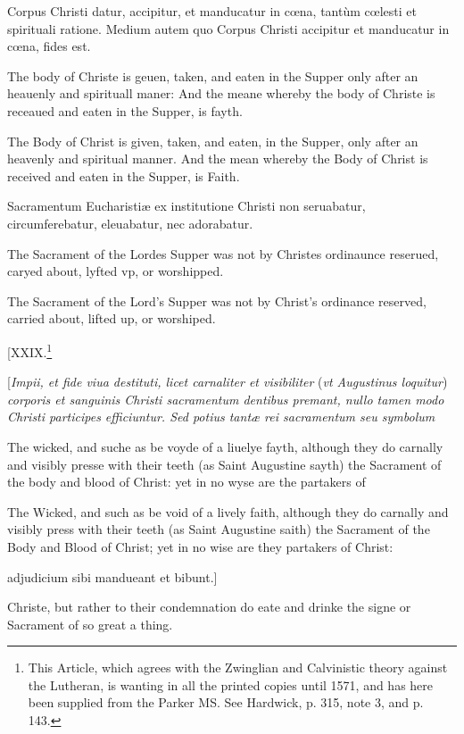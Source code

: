 Corpus Christi datur, accipitur, et manducatur in cœna, tantùm cœlesti et spirituali ratione. Medium autem quo Corpus Christi accipitur et manducatur in cœna, fides est.

The body of Christe is geuen, taken, and eaten in the Supper only after an heauenly and spirituall maner: And the meane whereby the body of Christe is receaued and eaten in the Supper, is fayth.

The Body of Christ is given, taken, and eaten, in the Supper, only after an heavenly and spiritual manner. And the mean whereby the Body of Christ is received and eaten in the Supper, is Faith.

Sacramentum Eucharistiæ ex institutione Christi non seruabatur, circumferebatur, eleuabatur, nec adorabatur.

The Sacrament of the Lordes Supper was not by Christes ordinaunce reserued, caryed about, lyfted vp, or worshipped.

The Sacrament of the Lord's Supper was not by Christ's ordinance reserved, carried about, lifted up, or worshiped.

[XXIX.\footnote{This Article, which agrees with the Zwinglian and Calvinistic theory against the Lutheran, is wanting in all the printed copies until 1571, and has here been supplied from the Parker MS. See Hardwick, p. 315, note 3, and p. 143.}


[\emph{Impii, et fide viua destituti, licet carnaliter et visibiliter} (\emph{vt Augustinus loquitur}) \emph{corporis et sanguinis Christi sacramentum dentibus premant, nullo tamen modo Christi participes efficiuntur. Sed potius tantæ rei sacramentum seu symbolum}

The wicked, and suche as be voyde of a liuelye fayth, although they do carnally and visibly presse with their teeth (as Saint Augustine sayth) the Sacrament of the body and blood of Christ: yet in no wyse are the partakers of

The Wicked, and such as be void of a lively faith, although they do carnally and visibly press with their teeth (as Saint Augustine saith) the Sacrament of the Body and Blood of Christ; yet in no wise are they partakers of Christ:

adjudicium sibi mandueant et bibunt.]

Christe, but rather to their condemnation do eate and drinke the signe or Sacrament of so great a thing.

